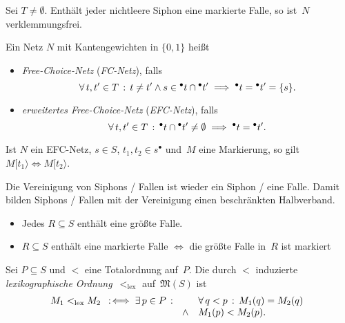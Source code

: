 \documentclass{cheat-sheet}
\newcommand{\preset}[1]{{}^\bullet{#1}} %
\newcommand{\postset}[1]{{#1}^\bullet} %
\newcommand{\activeTransition}[1]{[{#1}\rangle} %
\newcommand{\Markings}{\mathfrak{M}} %
\begin{document}
\begin{lem}
  Sei $T \neq \emptyset$.
  Enthält jeder nichtleere Siphon eine markierte Falle, so ist~$N$ verklemmungsfrei.
\end{lem}

\begin{defn}
  Ein Netz $N$ mit Kantengewichten in $\{ 0, 1 \}$ heißt
  \begin{itemize}
    \item \emph{Free-Choice-Netz} (\textit{FC-Netz}), falls
    \[
      \fa{t, t' \in T} t \neq t' \wedge s \in \preset{t} \cap \preset{t'} \implies \preset{t} = \preset{t'} = \{ s \}.
    \]
    \item \emph{erweitertes Free-Choice-Netz} (\textit{EFC-Netz}), falls
    \[
      \fa{t, t' \in T} \preset{t} \cap \preset{t'} \neq \emptyset \implies \preset{t} = \preset{t'}.
    \]
  \end{itemize}
\end{defn}

\begin{bem}
  Ist $N$ ein EFC-Netz, $s \in S$, $t_1, t_2 \in \postset{s}$ und~$M$ eine Markierung, so gilt $M \activeTransition{t_1} \iff M \activeTransition{t_2}$.
\end{bem}

\begin{lem}
  Die Vereinigung von Siphons / Fallen ist wieder ein Siphon / eine Falle.
  Damit bilden Siphons / Fallen mit der Vereinigung einen beschränkten Halbverband.
\end{lem}

\begin{kor}
  \begin{itemize}
    \item Jedes $R \subseteq S$ enthält eine größte Falle.
    \item $R \subseteq S$ enthält eine markierte Falle $\iff$ die größte Falle in~$R$ ist markiert
  \end{itemize}
\end{kor}

\begin{defn}
  Sei $P \subseteq S$ und ${<}$ eine Totalordnung auf~$P$.
  Die durch ${<}$ induzierte \emph{lexikographische Ordnung}~${<_\mathrm{lex}}$ auf~$\Markings(S)$ ist
  \[
    M_1 <_\mathrm{lex} M_2 \enspace:\!\iff \exists \, {p \in P} \,:\,
    \begin{array}[t]{r l}
      & \forall \, {q < p} \,:\, M_1(q) = M_2(q) \\
      \wedge & M_1(p) < M_2(p).
    \end{array}
  \]
\end{defn}
\end{document}
